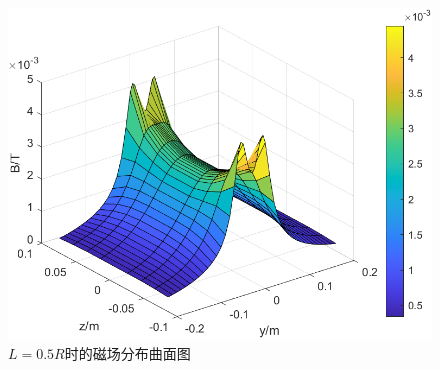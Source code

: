 \documentclass{ctexart}
\begin{document}
\begin{multicols}{2}
\begin{figure}[H]
    \includegraphics[scale=0.6]{./pic/matlab0.5R.png}
    \caption{$L=0.5R$时的磁场分布曲面图} 
    \label{matlab理论surf2}
\end{figure}

\end{multicols}
\end{document}
